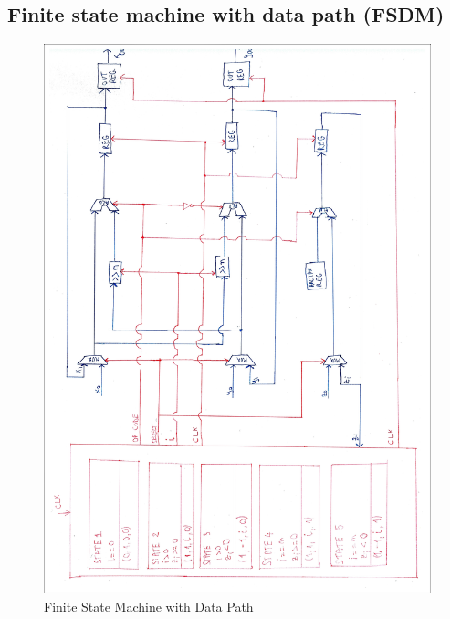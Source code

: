 \documentclass[12pt, a4paper,oneside]{article}
\begin{document}
\subsection{Finite state machine with data path (FSDM)}\label{ssec:fsdm}

\begin{figure}[H]
	\centering
	\includegraphics[width = \linewidth]{finite_state_machine_edit.jpg}
	\caption{Finite State Machine with Data Path}
	\label{fig:finite_state_machine}
\end{figure}

\printbibliography
\end{document}

